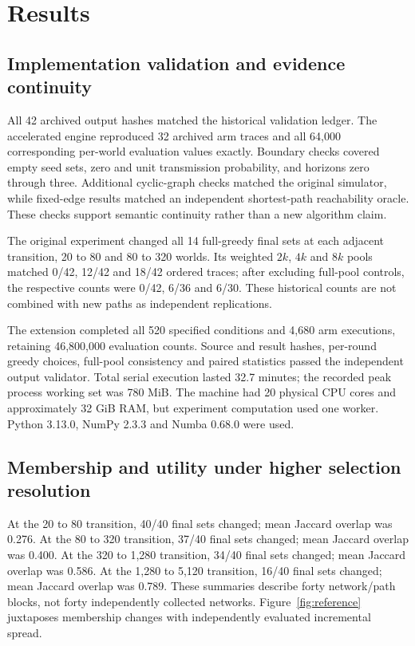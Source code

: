 \section{Results}
\subsection{Implementation validation and evidence continuity}
All 42 archived output hashes matched the historical validation ledger. The accelerated engine reproduced 32 archived arm traces and all 64,000 corresponding per-world evaluation values exactly. Boundary checks covered empty seed sets, zero and unit transmission probability, and horizons zero through three. Additional cyclic-graph checks matched the original simulator, while fixed-edge results matched an independent shortest-path reachability oracle. These checks support semantic continuity rather than a new algorithm claim.

The original experiment changed all 14 full-greedy final sets at each adjacent transition, 20 to 80 and 80 to 320 worlds. Its weighted $2k$, $4k$ and $8k$ pools matched 0/42, 12/42 and 18/42 ordered traces; after excluding full-pool controls, the respective counts were 0/42, 6/36 and 6/30. These historical counts are not combined with new paths as independent replications.

The extension completed all 520 specified conditions and 4,680 arm executions, retaining 46,800,000 evaluation counts. Source and result hashes, per-round greedy choices, full-pool consistency and paired statistics passed the independent output validator. Total serial execution lasted 32.7 minutes; the recorded peak process working set was 780 MiB. The machine had 20 physical CPU cores and approximately 32 GiB RAM, but experiment computation used one worker. Python 3.13.0, NumPy 2.3.3 and Numba 0.68.0 were used.

\subsection{Membership and utility under higher selection resolution}
At the 20 to 80 transition, 40/40 final sets changed; mean Jaccard overlap was 0.276. At the 80 to 320 transition, 37/40 final sets changed; mean Jaccard overlap was 0.400. At the 320 to 1,280 transition, 34/40 final sets changed; mean Jaccard overlap was 0.586. At the 1,280 to 5,120 transition, 16/40 final sets changed; mean Jaccard overlap was 0.789. These summaries describe forty network/path blocks, not forty independently collected networks. Figure~\ref{fig:reference} juxtaposes membership changes with independently evaluated incremental spread.


